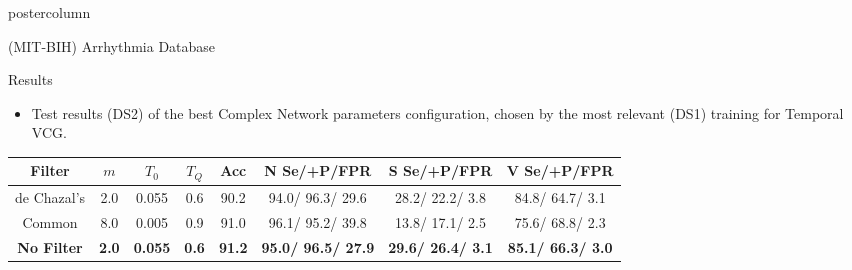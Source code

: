 \documentclass{article}
\begin{document}
\begin{frame}
\begin{columns}
\begin{column}{.5\textwidth}
\begin{beamercolorbox}[center,wd=\textwidth]{postercolumn}
\begin{minipage}[T]{.98\textwidth}
{\begin{block}{(MIT-BIH) Arrhythmia Database}
\begin{itemize}
						\end{itemize}
            	
            	
            	
            \end{block}

\vfill          
            
            \vfill
            	\begin{block}{Results}
            		\begin{itemize}
            			\item Test results (DS2) of the best Complex Network parameters configuration, chosen by the most relevant (DS1) training for Temporal VCG.
            		\end{itemize}      		
            		
            		{\small
            			
            			\begin{table}[h!]
            				
            				\begin{center}
            					
            					\label{tab:results3d} 
            					\centering	
            					\begin{tabular}{|c|c|c|c|c|c|c|c|} 
            						\hline 
            						Filter & $m$ & $T_0$ & $T_Q$ & Acc & N Se/+P/FPR & S Se/+P/FPR & V Se/+P/FPR   \\ \hline \hline
            						de Chazal's & 2.0 & 0.055  & 0.6 &90.2 &   94.0/  96.3/  29.6 &   28.2/  22.2/   3.8 &   84.8/  64.7/   3.1   \\ \hline			
            						Common   & 8.0 & 0.005 & 0.9 &   91.0 &   96.1/  95.2/  39.8 &   13.8/  17.1/   2.5 &   75.6/  68.8/   2.3 \\ 			\hline
            						\textbf{No Filter}& \textbf{2.0} & \textbf{0.055} & \textbf{0.6} &  \textbf{91.2} &   \textbf{95.0/  96.5/  27.9} &  \textbf{ 29.6/  26.4/   3.1} &   \textbf{85.1/  66.3/   3.0} \\             	\hline \hline 
            					\end{tabular}
            					\vspace{0.05cm}
            					\linebreak 
            					
%            							
            					

\end{center}
\end{table}}
\end{block}}
\end{minipage}
\end{beamercolorbox}
\end{column}
\end{columns}
\end{frame}
\end{document}
